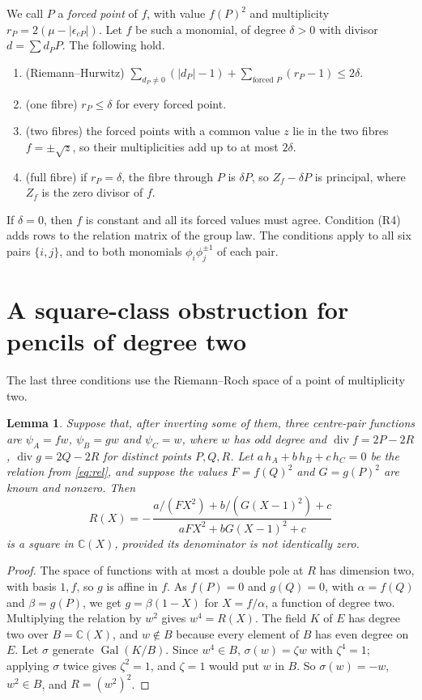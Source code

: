 \documentclass[11pt]{amsart}
\newtheorem{lemma}[theorem]{Lemma}
\theoremstyle{definition}
\newcommand{\C}{\mathbb{C}}
\newcommand{\Div}{\operatorname{div}}
\begin{document}
We call $P$ a \emph{forced point} of $f$, with value $f(P)^2$ and multiplicity
$r_P=2(\mu-|\epsilon_{cP}|)$. Let $f$ be such a monomial, of degree $\delta>0$ with divisor $d=\sum d_PP$. The
following hold.
\begin{enumerate}
\item[(R1)] (Riemann--Hurwitz) $\sum_{d_P\ne0}(|d_P|-1)+\sum_{\text{forced }P}(r_P-1)\le2\delta$.
\item[(R2)] (one fibre) $r_P\le\delta$ for every forced point.
\item[(R3)] (two fibres) the forced points with a common value $z$ lie in the two fibres $f=\pm\sqrt z$, so their
multiplicities add up to at most $2\delta$.
\item[(R4)] (full fibre) if $r_P=\delta$, the fibre through $P$ is $\delta P$, so $Z_f-\delta P$ is principal, where
$Z_f$ is the zero divisor of $f$.
\end{enumerate}
If $\delta=0$, then $f$ is constant and all its forced values must agree. Condition (R4) adds rows to the relation
matrix of the group law. The conditions apply to all six pairs $\{i,j\}$, and to both monomials
$\phi_i\phi_j^{\pm1}$ of each pair.

\section{A square-class obstruction for pencils of degree two}\label{sec:pencil}

The last three conditions use the Riemann--Roch space of a point of multiplicity two.

\begin{lemma}\label{lem:pencil}
Suppose that, after inverting some of them, three centre-pair functions are $\psi_A=fw$, $\psi_B=gw$ and $\psi_C=w$,
where $w$ has odd degree and $\Div f=2P-2R$, $\Div g=2Q-2R$ for distinct points $P,Q,R$. Let
$a\,h_A+b\,h_B+c\,h_C=0$ be the relation from \eqref{eq:rel}, and suppose the values $F=f(Q)^2$ and $G=g(P)^2$ are
known and nonzero. Then
\[
R(X)=-\,\frac{a/(FX^2)+b/(G(X-1)^2)+c}{aFX^2+bG(X-1)^2+c}
\]
is a square in $\C(X)$, provided its denominator is not identically zero.
\end{lemma}

\begin{proof}
The space of functions with at most a double pole at $R$ has dimension two, with basis $1,f$, so $g$ is affine in
$f$. As $f(P)=0$ and $g(Q)=0$, with $\alpha=f(Q)$ and $\beta=g(P)$, we get $g=\beta(1-X)$ for $X=f/\alpha$, a function
of degree two. Multiplying the relation by $w^2$ gives $w^4=R(X)$. The field $K$ of $E$ has degree two over
$B=\C(X)$, and $w\notin B$ because every element of $B$ has even degree on $E$. Let $\sigma$ generate
$\operatorname{Gal}(K/B)$. Since $w^4\in B$, $\sigma(w)=\zeta w$ with $\zeta^4=1$; applying $\sigma$ twice gives
$\zeta^2=1$, and $\zeta=1$ would put $w$ in $B$. So $\sigma(w)=-w$, $w^2\in B$, and $R=(w^2)^2$.
\end{proof}
\end{document}
